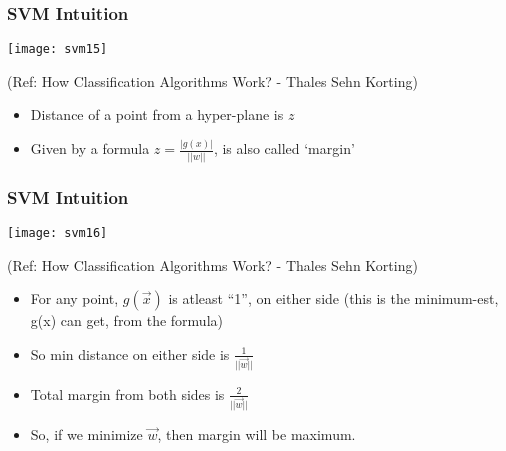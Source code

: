 \begin{frame}[fragile] \frametitle{SVM Intuition}

\begin{center}
\texttt{[image: svm15]}

\tiny{(Ref: How Classification Algorithms Work? - Thales Sehn Korting)}
\end{center}
\begin{itemize}
\item Distance of a point from a hyper-plane is $z$
\item Given by a formula $z = \frac{|g(x)|}{||w||}$, is also called `margin'
\end{itemize}
\end{frame}

\begin{frame}[fragile] \frametitle{SVM Intuition}

\begin{center}
\texttt{[image: svm16]}

\tiny{(Ref: How Classification Algorithms Work? - Thales Sehn Korting)}
\end{center}
\begin{itemize}
\item For any point, $g(\overrightarrow{x})$ is atleast ``1'', on either side (this is the minimum-est, g(x) can get, from the formula)
\item So min distance on either side is $\frac{1}{||\overrightarrow{w}||}$
\item Total margin from both sides is $\frac{2}{||\overrightarrow{w}||}$
\item So, if we minimize $\overrightarrow{w}$, then margin will be maximum.
\end{itemize}
\end{frame}




